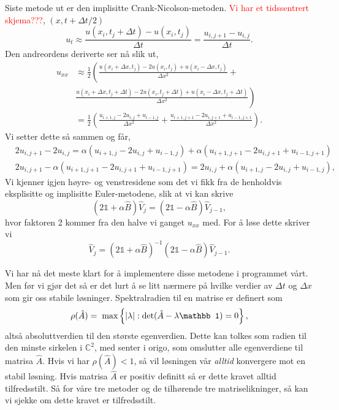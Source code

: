 \documentclass[norsk, 10pt]{article}
\def\para#1{\left( #1 \right)}
\newcommand{\red}[1]{\textcolor{red}{#1}}
\begin{document}
Siste metode ut er den implisitte Crank-Nicolson-metoden. \red{Vi har et tidssentrert skjema???}, $(x,t+\Delta t/2)$
 \[
u_t\approx \frac{u(x_i,t_j+\Delta t)-u(x_i,t_j)}{\Delta t} = \frac{u_{i,j+1}-u_{i,j}}{\Delta t}.
\]
Den andreordens deriverte ser nå slik ut,
\begin{align*}
u_{xx}&\approx \frac{1}{2}\left(\frac{u(x_i+\Delta x,t_j)-2u(x_i,t_j)+u(x_i-\Delta x,t_j)}{\Delta x^2}+\right.\\
&\left. \frac{u(x_i+\Delta x,t_j+\Delta t)-2u(x_i,t_j+\Delta t)+u(x_i-\Delta x,t_j+\Delta t)}{\Delta x^2} \right) \\
& = \frac{1}{2}\left(\frac{u_{i+1,j}-2u_{i,j}+u_{i-1,j}}{\Delta x^2}+\frac{u_{i+1,j+1}-2u_{i,j+1}+u_{i-1,j+1}}{\Delta x^2} \right).
\end{align*}
Vi setter dette så sammen og får,
\begin{align*}
& 2u_{i,j+1}-2u_{i,j} = \alpha\para{u_{i+1,j}-2u_{i,j}+u_{i-1,j}}+\alpha\para{u_{i+1,j+1}-2u_{i,j+1}+u_{i-1,j+1}} \\
& 2u_{i,j+1} - \alpha\para{u_{i+1,j+1}-2u_{i,j+1}+u_{i-1,j+1}} = 2u_{i,j} + \alpha\para{u_{i+1,j}-2u_{i,j}+u_{i-1,j}},
\end{align*}
Vi kjenner igjen høyre- og venstresidene som det vi fikk fra de henholdvis eksplisitte og implisitte Euler-metodene, slik at vi kan skrive
$$ (2\mathbb 1 + \alpha \hat B)\hat V_j = (2\mathbb 1 - \alpha \hat B)\hat V_{j-1},$$
hvor faktoren 2 kommer fra den halve vi ganget $u_{xx}$ med. For å løse dette skriver vi
$$ \hat V_j = (2\mathbb 1 + \alpha \hat B)^{-1}(2\mathbb 1 - \alpha \hat B)\hat V_{j-1}. $$

Vi har nå det meste klart for å implementere disse metodene i programmet vårt. Men før vi gjør det så er det lurt å se litt nærmere på hvilke verdier av  $\Delta t$ og $\Delta x$ som gir oss stabile løsninger. Spektralradien til en matrise er definert som
$$ \rho(\hat{A}) = \hspace{0.1cm}\mathrm{max}\left\{|\lambda|:\mathrm{det}(\hat A-\lambda\mathbb 1)=0\right\}, $$
altså absoluttverdien til den største egenverdien. Dette kan tolkes som radien til den minste sirkelen i $\mathbb C^2$, med senter i origo, som omslutter alle egenverdiene til matrisa $\hat A$. Hvis vi har $\rho(\hat{A}) < 1$, så vil løsningen vår \emph{alltid} konvergere mot en stabil løsning. Hvis matrisa $\hat A $ er positiv definitt så er dette kravet alltid tilfredsstilt. Så for våre tre metoder og de tilhørende tre matriselikninger, så kan vi sjekke om dette kravet er tilfredsstilt.
\end{document}
